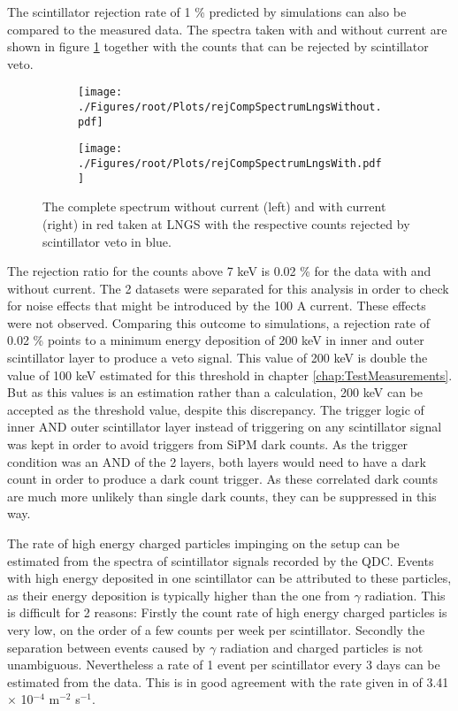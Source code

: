 The scintillator rejection rate of 1 \% predicted by simulations can also be compared to the measured data. The spectra taken with and without current are shown in figure \ref{fig:rejSpecLngs} together with the counts that can be rejected by scintillator veto.
\begin{figure}[h]
 \centering
 \begin{subfigure}{.49\textwidth}
 \centering
 \texttt{[image: ./Figures/root/Plots/rejCompSpectrumLngsWithout.pdf]}
 \end{subfigure}
 \hfill
 \begin{subfigure}{.49\textwidth}
 \centering
 \texttt{[image: ./Figures/root/Plots/rejCompSpectrumLngsWith.pdf]}
 \end{subfigure}
 \caption{The complete spectrum without current (left) and with current (right) in red taken at LNGS with the respective counts rejected by scintillator veto in blue.}
 \label{fig:rejSpecLngs}
\end{figure}
 The rejection ratio for the counts above 7 keV is 0.02 \% for the data with and without current. The 2 datasets were separated for this analysis in order to check for noise effects that might be introduced by the 100 A current. These effects were not observed. Comparing this outcome to simulations, a rejection rate of 0.02 \% points to a minimum energy deposition of 200 keV in inner and outer scintillator layer to produce a veto signal. This value of 200 keV is double the value of 100 keV estimated for this threshold in chapter \ref{chap:TestMeasurements}. But as this values is an estimation rather than a calculation, 200 keV can be accepted as the threshold value, despite this discrepancy. The trigger logic of inner AND outer scintillator layer instead of triggering on any scintillator signal was kept in order to avoid triggers from SiPM dark counts. As the trigger condition was an AND of the 2 layers, both layers would need to have a dark count in order to produce a dark count trigger. As these correlated dark counts are much more unlikely than single dark counts, they can be suppressed in this way. 

The rate of high energy charged particles impinging on the setup can be estimated from the spectra of scintillator signals recorded by the QDC. Events with high energy deposited in one scintillator can be attributed to these particles, as their energy deposition is typically higher than the one from $\gamma$ radiation. This is difficult for 2 reasons: Firstly the count rate of high energy charged particles is very low, on the order of a few counts per week per scintillator. Secondly the separation between events caused by $\gamma$ radiation and charged particles is not unambiguous. Nevertheless a rate of 1 event per scintillator every 3 days can be estimated from the data. This is in good agreement with the rate given in \cite{Bellini2013} of 3.41 $\times$ 10$^{-4}$ m$^{-2}$ s$^{-1}$.

